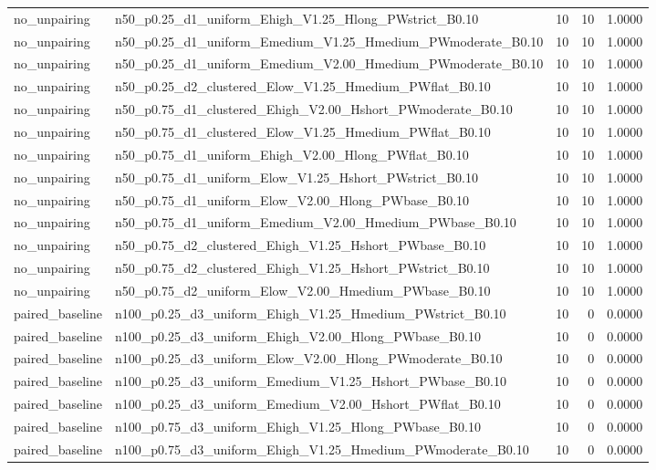 \begin{tabular}{llrrr}
no_unpairing & n50_p0.25_d1_uniform_Ehigh_V1.25_Hlong_PWstrict_B0.10 & 10 & 10 & 1.0000 \\
no_unpairing & n50_p0.25_d1_uniform_Emedium_V1.25_Hmedium_PWmoderate_B0.10 & 10 & 10 & 1.0000 \\
no_unpairing & n50_p0.25_d1_uniform_Emedium_V2.00_Hmedium_PWmoderate_B0.10 & 10 & 10 & 1.0000 \\
no_unpairing & n50_p0.25_d2_clustered_Elow_V1.25_Hmedium_PWflat_B0.10 & 10 & 10 & 1.0000 \\
no_unpairing & n50_p0.75_d1_clustered_Ehigh_V2.00_Hshort_PWmoderate_B0.10 & 10 & 10 & 1.0000 \\
no_unpairing & n50_p0.75_d1_clustered_Elow_V1.25_Hmedium_PWflat_B0.10 & 10 & 10 & 1.0000 \\
no_unpairing & n50_p0.75_d1_uniform_Ehigh_V2.00_Hlong_PWflat_B0.10 & 10 & 10 & 1.0000 \\
no_unpairing & n50_p0.75_d1_uniform_Elow_V1.25_Hshort_PWstrict_B0.10 & 10 & 10 & 1.0000 \\
no_unpairing & n50_p0.75_d1_uniform_Elow_V2.00_Hlong_PWbase_B0.10 & 10 & 10 & 1.0000 \\
no_unpairing & n50_p0.75_d1_uniform_Emedium_V2.00_Hmedium_PWbase_B0.10 & 10 & 10 & 1.0000 \\
no_unpairing & n50_p0.75_d2_clustered_Ehigh_V1.25_Hshort_PWbase_B0.10 & 10 & 10 & 1.0000 \\
no_unpairing & n50_p0.75_d2_clustered_Ehigh_V1.25_Hshort_PWstrict_B0.10 & 10 & 10 & 1.0000 \\
no_unpairing & n50_p0.75_d2_uniform_Elow_V2.00_Hmedium_PWbase_B0.10 & 10 & 10 & 1.0000 \\
paired_baseline & n100_p0.25_d3_uniform_Ehigh_V1.25_Hmedium_PWstrict_B0.10 & 10 & 0 & 0.0000 \\
paired_baseline & n100_p0.25_d3_uniform_Ehigh_V2.00_Hlong_PWbase_B0.10 & 10 & 0 & 0.0000 \\
paired_baseline & n100_p0.25_d3_uniform_Elow_V2.00_Hlong_PWmoderate_B0.10 & 10 & 0 & 0.0000 \\
paired_baseline & n100_p0.25_d3_uniform_Emedium_V1.25_Hshort_PWbase_B0.10 & 10 & 0 & 0.0000 \\
paired_baseline & n100_p0.25_d3_uniform_Emedium_V2.00_Hshort_PWflat_B0.10 & 10 & 0 & 0.0000 \\
paired_baseline & n100_p0.75_d3_uniform_Ehigh_V1.25_Hlong_PWbase_B0.10 & 10 & 0 & 0.0000 \\
paired_baseline & n100_p0.75_d3_uniform_Ehigh_V1.25_Hmedium_PWmoderate_B0.10 & 10 & 0 & 0.0000 \\

\end{tabular}
